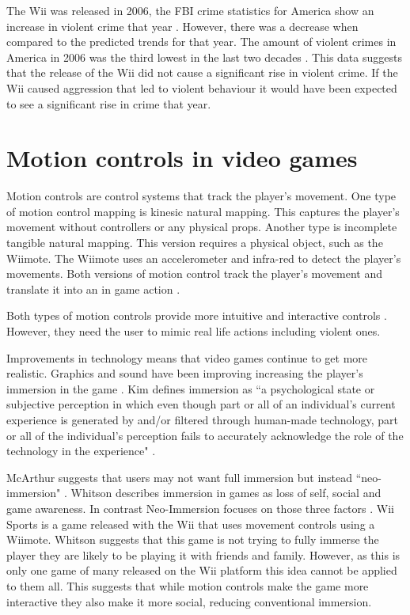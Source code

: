 \documentclass{scrartcl}
\begin{document}
The Wii was released in 2006, the FBI crime statistics for America show an increase in violent crime that year \cite{FBI}.  However, there was a decrease when compared to the predicted trends for that year. The amount of violent crimes in America in 2006 was the third lowest in the last two decades \cite{FBIArchives}. This data suggests that the release of the Wii did not cause a significant rise in violent crime. If the Wii caused aggression that led to violent behaviour it would  have been expected to see a significant rise in crime that year.


\section{Motion controls in video games}
Motion controls are control systems that track the player's movement. One type of motion control mapping is kinesic natural mapping. This captures the player's movement without controllers or any physical props. Another type is incomplete tangible natural mapping. This version requires a physical object, such as the Wiimote. The Wiimote uses an accelerometer and infra-red to detect the player's movements. Both versions of motion control track the player's movement and translate it into an in game action \cite{McEwan2012}.

Both types of motion controls provide more intuitive and interactive controls \cite{Kim}.  However, they need the user to mimic real life actions including violent ones. 

\bigskip
Improvements in technology means that video games continue to get more realistic. Graphics and sound have been improving increasing the player's immersion in the game \cite{Kim}.
Kim defines immersion as ``a psychological state or subjective perception in which even though part or all of an   individual’s   current   experience is generated by and/or filtered through human-made technology, part or all of the individual’s perception fails to accurately acknowledge the role of the technology in the experience" \cite{Kim}.

\bigskip
McArthur suggests that users may not want full immersion but instead ``neo-immersion" \cite{McArthur}. Whitson describes immersion in games as loss of  self, social and game awareness. In contrast Neo-Immersion focuses on those three factors \cite{Whitson}. Wii Sports is a game released with the Wii that uses movement controls using a Wiimote. Whitson suggests that this game is not trying to fully immerse the player they are likely to be playing it with friends and family. However, as this is only one game of many released on the Wii platform this idea cannot be applied to them all. This suggests that while motion controls make the game more interactive they also make it more social, reducing conventional immersion.
\end{document}
